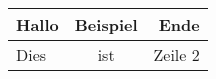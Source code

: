 \begin{tabular}{|l|c|r|}
  \hline
  Hallo & Beispiel & Ende \\
  \hline
  Dies  & ist      & Zeile 2 \\
  \hline
\end{tabular}
